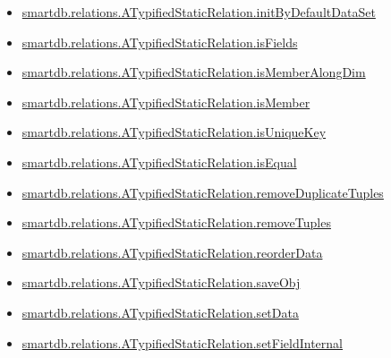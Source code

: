 \documentclass[letterpaper,10pt,english]{sphinxmanual}
\begin{document}
\begin{itemize}
\item {} 
{\hyperref[chap_func:smartdb-relations-atypifiedstaticrelation-initbydefaultdataset]{smartdb.relations.ATypifiedStaticRelation.initByDefaultDataSet}}

\item {} 
{\hyperref[chap_func:smartdb-relations-atypifiedstaticrelation-isfields]{smartdb.relations.ATypifiedStaticRelation.isFields}}

\item {} 
{\hyperref[chap_func:smartdb-relations-atypifiedstaticrelation-ismemberalongdim]{smartdb.relations.ATypifiedStaticRelation.isMemberAlongDim}}

\item {} 
{\hyperref[chap_func:smartdb-relations-atypifiedstaticrelation-ismember]{smartdb.relations.ATypifiedStaticRelation.isMember}}

\item {} 
{\hyperref[chap_func:smartdb-relations-atypifiedstaticrelation-isuniquekey]{smartdb.relations.ATypifiedStaticRelation.isUniqueKey}}

\item {} 
{\hyperref[chap_func:smartdb-relations-atypifiedstaticrelation-isequal]{smartdb.relations.ATypifiedStaticRelation.isEqual}}

\item {} 
{\hyperref[chap_func:smartdb-relations-atypifiedstaticrelation-removeduplicatetuples]{smartdb.relations.ATypifiedStaticRelation.removeDuplicateTuples}}

\item {} 
{\hyperref[chap_func:smartdb-relations-atypifiedstaticrelation-removetuples]{smartdb.relations.ATypifiedStaticRelation.removeTuples}}

\item {} 
{\hyperref[chap_func:smartdb-relations-atypifiedstaticrelation-reorderdata]{smartdb.relations.ATypifiedStaticRelation.reorderData}}

\item {} 
{\hyperref[chap_func:smartdb-relations-atypifiedstaticrelation-saveobj]{smartdb.relations.ATypifiedStaticRelation.saveObj}}

\item {} 
{\hyperref[chap_func:smartdb-relations-atypifiedstaticrelation-setdata]{smartdb.relations.ATypifiedStaticRelation.setData}}

\item {} 
{\hyperref[chap_func:smartdb-relations-atypifiedstaticrelation-setfieldinternal]{smartdb.relations.ATypifiedStaticRelation.setFieldInternal}}


\end{itemize}
\end{document}
